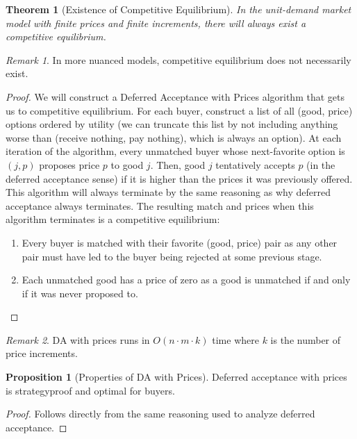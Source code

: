 \documentclass[dvipsnames]{article}
\newtheorem{theorem}{Theorem}[section]
\theoremstyle{definition}
\newtheorem{proposition}[definition]{Proposition}
\theoremstyle{remark}
\newtheorem*{remark}{Remark}
\begin{document}
\begin{theorem}[Existence of Competitive Equilibrium]
	In the unit-demand market model with finite prices and finite increments, there will always exist a competitive equilibrium.
\end{theorem}

\begin{remark}
	In more nuanced models, competitive equilibrium does not necessarily exist. 
\end{remark}

\begin{proof}
	We will construct a Deferred Acceptance with Prices algorithm that gets us to competitive equilibrium. For each buyer, construct a list of all (good, price) options ordered by utility (we can truncate this list by not including anything worse than (receive nothing, pay nothing), which is always an option). At each iteration of the algorithm, every unmatched buyer whose next-favorite option is $(j,p)$ proposes price $p$ to good $j$. Then, good $j$ tentatively accepts $p$ (in the deferred acceptance sense) if it is higher than the prices it was previously offered. This algorithm will always terminate by the same reasoning as why deferred acceptance always terminates. The resulting match and prices when this algorithm terminates is a competitive equilibrium:
	
	\begin{enumerate}
		\item Every buyer is matched with their favorite (good, price) pair as any other pair must have led to the buyer being rejected at some previous stage.
		\item Each unmatched good has a price of zero as a good is unmatched if and only if it was never proposed to.
	\end{enumerate}
\end{proof}

\begin{remark}
	DA with prices runs in $O(n \cdot m \cdot k)$ time where $k$ is the number of price increments.
\end{remark}

\begin{proposition}[Properties of DA with Prices]
	Deferred acceptance with prices is strategyproof and optimal for buyers.
\end{proposition}

\begin{proof}
	Follows directly from the same reasoning used to analyze deferred acceptance. 
\end{proof}
\end{document}
